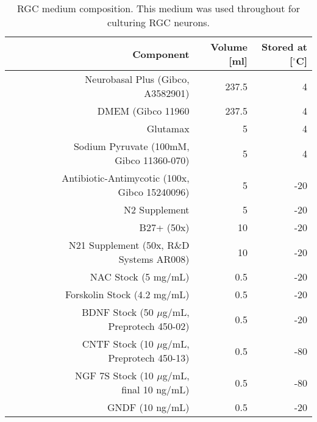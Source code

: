 \begin{table*}
    \begin{adjustbox}{max width=\textwidth,center}
        \begin{tabular}{@{}rrrrrrrr@{}}
            \toprule
            & & & & & Component & Volume [ml] & Stored at [$^{\circ}$C] \\
            \midrule
            & & & & & Neurobasal Plus (Gibco, A3582901)               & 237.5    &   4\\
            & & & & & DMEM (Gibco 11960                               & 237.5    &   4\\
            & & & & & Glutamax                                        & 5        &   4\\
            & & & & & Sodium Pyruvate (100mM, Gibco 11360-070)        & 5        &   4\\
            & & & & & Antibiotic-Antimycotic (100x, Gibco 15240096)   & 5        & -20\\
            & & & & & N2 Supplement                                   & 5        & -20\\
            & & & & & B27+ (50x)                                      & 10       & -20\\
            & & & & & N21 Supplement (50x, R$\&$D Systems AR008)      & 10       & -20\\
            & & & & & NAC Stock (5 mg/mL)                             & 0.5      & -20\\
            & & & & & Forskolin Stock (4.2 mg/mL)                     & 0.5      & -20\\
            & & & & & BDNF Stock (50 $\mu$g/mL, Preprotech 450-02)    & 0.5      & -20\\
            & & & & & CNTF Stock (10 $\mu$g/mL, Preprotech 450-13)    & 0.5      & -80\\
            & & & & & NGF 7S Stock (10 $\mu$g/mL, final 10 ng/mL)     & 0.5      & -80\\
            & & & & & GNDF (10 ng/mL)                                 & 0.5      & -20\\
            \bottomrule
        \end{tabular}
    \end{adjustbox}
    \caption[RGC medium composition]{RGC medium composition. This medium was
            used throughout for culturing RGC neurons.}
    \label{rgcmedium}
\end{table*}


